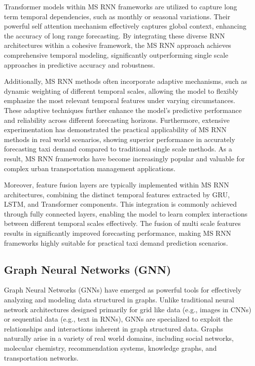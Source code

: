 \documentclass{article}
\begin{document}
Transformer models within MS RNN frameworks are utilized to capture long term temporal dependencies, such as monthly or seasonal variations. Their powerful self attention mechanism effectively captures global context, enhancing the accuracy of long range forecasting. By integrating these diverse RNN architectures within a cohesive framework, the MS RNN approach achieves comprehensive temporal modeling, significantly outperforming single scale approaches in predictive accuracy and robustness.

Additionally, MS RNN methods often incorporate adaptive mechanisms, such as dynamic weighting of different temporal scales, allowing the model to flexibly emphasize the most relevant temporal features under varying circumstances. These adaptive techniques further enhance the model's predictive performance and reliability across different forecasting horizons. Furthermore, extensive experimentation has demonstrated the practical applicability of MS RNN methods in real world scenarios, showing superior performance in accurately forecasting taxi demand compared to traditional single scale methods. As a result, MS RNN frameworks have become increasingly popular and valuable for complex urban transportation management applications.

Moreover, feature fusion layers are typically implemented within MS RNN architectures, combining the distinct temporal features extracted by GRU, LSTM, and Transformer components. This integration is commonly achieved through fully connected layers, enabling the model to learn complex interactions between different temporal scales effectively. The fusion of multi scale features results in significantly improved forecasting performance, making MS RNN frameworks highly suitable for practical taxi demand prediction scenarios.
\subsection{Graph Neural Networks (GNN)}

Graph Neural Networks (GNNs) have emerged as powerful tools for effectively analyzing and modeling data structured in graphs. Unlike traditional neural network architectures designed primarily for grid like data (e.g., images in CNNs) or sequential data (e.g., text in RNNs), GNNs are specialized to exploit the relationships and interactions inherent in graph structured data. Graphs naturally arise in a variety of real world domains, including social networks, molecular chemistry, recommendation systems, knowledge graphs, and transportation networks\cite{sanchezlengeling_2021_a}.
\end{document}
